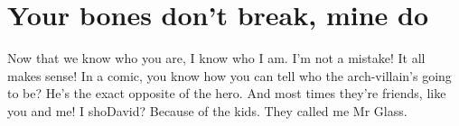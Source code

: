 \section{Your bones don't break, mine do}

Now that we know who you are, I know who I am. I'm not a mistake! It all makes sense! In a comic, you know how you can tell who the arch-villain's going to be? He's the exact opposite of the hero. And most times they're friends, like you and me! I shoDavid? Because of the kids. They called me Mr Glass.
